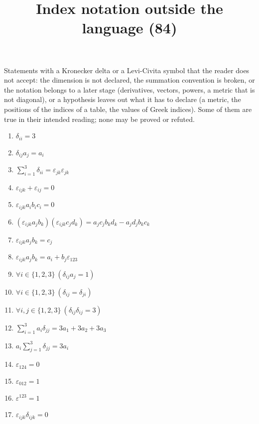 \documentclass[11pt,a4paper]{article}
\title{Index notation outside the language (84)}
\author{}
\date{}
\begin{document}
\maketitle
Statements with a Kronecker delta or a Levi-Civita symbol that the reader does not accept: the dimension is not declared, the summation convention is broken, or the notation belongs to a later stage (derivatives, vectors, powers, a metric that is not diagonal), or a hypothesis leaves out what it has to declare (a metric, the positions of the indices of a table, the values of Greek indices). Some of them are true in their intended reading; none may be proved or refuted.

\begin{enumerate}
\item $\displaystyle \delta_{ii} = 3$
\item $\displaystyle \delta_{ij} a_{j} = a_{i}$
\item $\displaystyle \sum_{i=1}^{3} \delta_{ii} = \varepsilon_{jk}\varepsilon_{jk}$
\item $\displaystyle \varepsilon_{ijk} + \varepsilon_{ij} = 0$
\item $\displaystyle \varepsilon_{ijk} a_{i} b_{i} c_{i} = 0$
\item $\displaystyle (\varepsilon_{ijk} a_{j} b_{k})(\varepsilon_{ijk} c_{j} d_{k}) = a_{j} c_{j} b_{k} d_{k} - a_{j} d_{j} b_{k} c_{k}$
\item $\displaystyle \varepsilon_{ijk} a_{j} b_{k} = c_{j}$
\item $\displaystyle \varepsilon_{ijk} a_{j} b_{k} = a_{i} + b_{j}\varepsilon_{123}$
\item $\displaystyle \forall i \in \{1, 2, 3\}\ \left( \delta_{ij} a_{j} = 1 \right)$
\item $\displaystyle \forall i \in \{1, 2, 3\}\ \left( \delta_{ij} = \delta_{ji} \right)$
\item $\displaystyle \forall i, j \in \{1, 2, 3\}\ \left( \delta_{ij}\delta_{ij} = 3 \right)$
\item $\displaystyle \sum_{i=1}^{3} a_{i}\delta_{jj} = 3 a_{1} + 3 a_{2} + 3 a_{3}$
\item $\displaystyle a_{i}\sum_{j=1}^{3} \delta_{jj} = 3 a_{i}$
\item $\displaystyle \varepsilon_{124} = 0$
\item $\displaystyle \varepsilon_{012} = 1$
\item $\displaystyle \varepsilon^{123} = 1$
\item $\displaystyle \varepsilon_{ijk}\delta_{ijk} = 0$

\end{enumerate}
\end{document}

